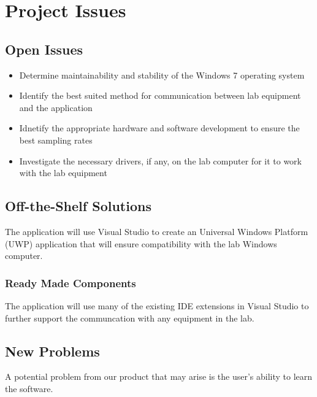 \documentclass[12pt, titlepage]{article}
\begin{document}
\section{Project Issues}

\subsection{Open Issues}
\begin{itemize}
  \item Determine maintainability and stability of the Windows 7 operating system
  \item Identify the best suited method for communication between lab equipment and the application
  \item Idnetify the appropriate hardware and software development to ensure the best sampling rates
  \item Investigate the necessary drivers, if any, on the lab computer for it to work with the lab equipment
\end{itemize}

\subsection{Off-the-Shelf Solutions}
The application will use Visual Studio to create an Universal Windows Platform (UWP) application that will ensure compatibility with the lab Windows computer.


\subsubsection{Ready Made Components}

The application will use many of the existing IDE extensions in Visual Studio to further support the communcation with any equipment in the lab.

\subsection{New Problems}
 A potential problem from our product that may arise is the user's ability to learn the software.
\end{document}
